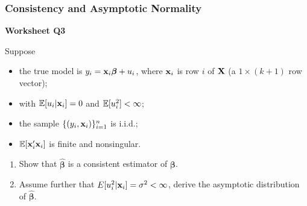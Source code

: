 \documentclass[xcolor=svgnames,9pt,english,aspectratio=169,t]{beamer}
\begin{document}
\begin{frame}
\frametitle{Consistency and Asymptotic Normality}
\textbf{Worksheet Q3}\medskip

Suppose 
\begin{itemize}
\item the true model is $y_i = \mathbf{x}_i\boldsymbol{\beta} + u_i$, where $\mathbf{x}_i$ is row $i$ of $\mathbf{X}$ (a $1 \times (k+1)$ row vector);
\item with $\mathbb{E}[u_i|\mathbf{x}_i]=0$ and $\mathbb{E}[u_i^2]<\infty$;
\item the sample $\{(y_i,\mathbf{x}_i)\}_{i=1}^n$ is i.i.d.; 
\item $\mathbb{E}[\mathbf{x}_i'\mathbf{x}_i]$ is finite and nonsingular.  
\end{itemize}\medskip
 
\begin{enumerate}\itemsep1em
    \item Show that $\hat{\boldsymbol{\beta}}$ is a consistent estimator of $\boldsymbol{\beta}$.
    \item Assume further that $E[u_i^2|\mathbf{x}_i]=\sigma^2<\infty$, derive the asymptotic distribution of $\hat{\boldsymbol{\beta}}$.
\end{enumerate}


\end{frame}


\end{document}
